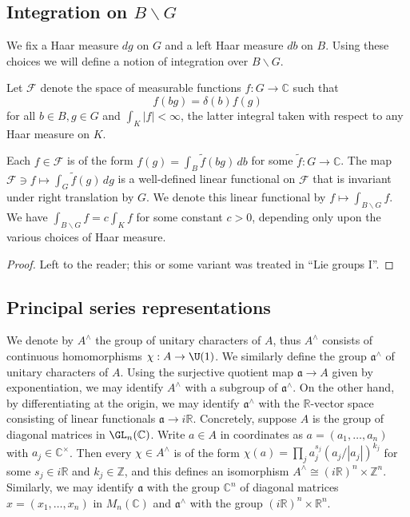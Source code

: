 \documentclass[reqno]{amsart} 
\begin{document}
\subsection{Integration on \texorpdfstring{$B \backslash G$}{B \ G}}\label{sec:integr-b-backsl}
We fix a Haar measure $d g$ on $G$ and a left Haar measure $d b$ on $B$.  Using these choices we will define a notion of integration over $B \backslash G$.

Let $\mathcal{F}$ denote the space of measurable functions $f : G \rightarrow \mathbb{C}$ such that
\begin{equation*}
  f(b g) = \delta(b) f(g)
\end{equation*}
for all $b \in B, g \in G$ and $\int_K |f| < \infty$, the latter integral taken with respect to any Haar measure on $K$.

\begin{lemma}
  Each $f \in \mathcal{F}$ is of the form $f(g) = \int_{B} \tilde{f}(b g) \, d b$ for some $\tilde{f} : G \rightarrow \mathbb{C}$.  The map $\mathcal{F} \ni f \mapsto \int_G \tilde{f}(g) \, d g$ is a well-defined linear functional on $\mathcal{F}$ that is invariant under right translation by $G$.  We denote this linear functional by $f \mapsto \int_{B \backslash G} f$.  We have $\int_{B \backslash G} f = c \int_K f$ for some constant $c > 0$, depending only upon the various choices of Haar measure.
\end{lemma}
\begin{proof}
  Left to the reader; this or some variant was treated in ``Lie groups I''.
\end{proof}

\subsection{Principal series representations}\label{sec:cnh2vrkcqy}
We denote by $A^\wedge$ the group of unitary characters of $A$, thus $A^\wedge$ consists of continuous homomorphisms $\chi : A \rightarrow \U(1)$.  We similarly define the group $\mathfrak{a}^\wedge$ of unitary characters of $A$.  Using the surjective quotient map $\mathfrak{a} \rightarrow A$ given by exponentiation, we may identify $A^\wedge$ with a subgroup of $\mathfrak{a}^\wedge$.  On the other hand, by differentiating at the origin, we may identify $\mathfrak{a}^\wedge$ with the $\mathbb{R}$-vector space consisting of linear functionals $\mathfrak{a} \rightarrow i\mathbb{R}$.  Concretely, suppose $A$ is the group of diagonal matrices in $\GL_n(\mathbb{C})$.  Write $a \in A$ in coordinates as $a = (a_1,\dotsc,a_n)$ with $a_j \in \mathbb{C}^\times$.  Then every $\chi \in A^\wedge$ is of the form $\chi(a) = \prod_j a_j^{s_j} (a_j/|a_j|)^{k_j}$ for some $s_j \in i \mathbb{R}$ and $k_j \in \mathbb{Z}$, and this defines an isomorphism $A^\wedge \cong (i \mathbb{R})^n \times \mathbb{Z}^n$.  Similarly, we may identify $\mathfrak{a}$ with the group $\mathbb{C}^n$ of diagonal matrices $x = (x_1,\dotsc,x_n)$ in $M_n(\mathbb{C})$ and $\mathfrak{a}^\wedge$ with the group $(i \mathbb{R})^n \times \mathbb{R}^n$.
\end{document}
